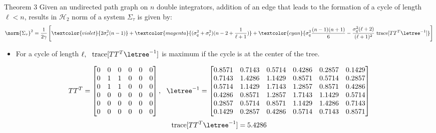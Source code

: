 \begin{frame}
		\begin{myblock}{Theorem 3}
		Given an undirected path graph on $n$ double integrators, addition of an edge that leads to the formation of a cycle of length $\ell < n $, results in $\mathcal{H}_2$ norm of a system $\Sigma_{\tau}$ is given by:
		$$\norm{\Sigma_{\tau}}^2=\frac{1}{2\gamma}\left[\textcolor{violet}{2\sigma_r^2(n-1)}+\textcolor{magenta}{(\sigma_{q}^2+\sigma_r^2)(n-2+\frac{1}{\ell+1})}+\textcolor{cyan}{\sigma_q^2\frac{(n-1)(n+1)}{6}-\frac{\sigma_q^2(\ell+2)}{(\ell+1)^2}\text{ trace}[TT^T\letree^{-1}]}\right]$$
	\end{myblock}
\vspace{-0.3cm}
\begin{alertblock}{}
	\begin{itemize}
\item For a cycle of length $\ell, ~~\text{trace}[TT^T\letree^{-1}]$ is maximum if the cycle is at the center of the tree.	
\end{itemize}
\end{alertblock}
\vspace{-0.5cm}
	$$TT^T=\begin{bmatrix}
		0 & 0 & 0 & 0 & 0 & 0 \\
		0 & 1 & 1 & 0 & 0 & 0 \\
		0 & 1 & 1 & 0 & 0 & 0 \\
		0 & 0 & 0 & 0 & 0 & 0 \\
		0 & 0 & 0 & 0 & 0 & 0 \\
		0 & 0 & 0 & 0 & 0 & 0 
	\end{bmatrix},~~\letree^{-1}=\begin{bmatrix}
	0.8571 & 0.7143 & 0.5714 & 0.4286 & 0.2857 & 0.1429 \\
	0.7143 & 1.4286 & 1.1429 & 0.8571 & 0.5714 & 0.2857 \\
	0.5714 & 1.1429 & 1.7143 & 1.2857 & 0.8571 & 0.4286 \\
	0.4286 & 0.8571 & 1.2857 & 1.7143 & 1.1429 & 0.5714 \\
	0.2857 & 0.5714 & 0.8571 & 1.1429 & 1.4286 & 0.7143 \\
	0.1429 & 0.2857 & 0.4286 & 0.5714 & 0.7143 & 0.8571 
	\end{bmatrix}$$
	$$\text{trace}[TT^T\letree^{-1}]=5.4286$$
\end{frame}
